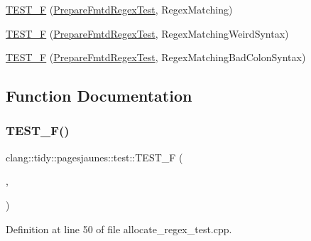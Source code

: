 \begin{DoxyCompactItemize}
\hyperlink{namespaceclang_1_1tidy_1_1pagesjaunes_1_1test_adefa0c55e6339f7e62c34be0a20923fa}{T\+E\+S\+T\+\_\+F} (\hyperlink{classclang_1_1tidy_1_1pagesjaunes_1_1test_1_1_prepare_fmtd_regex_test}{Prepare\+Fmtd\+Regex\+Test}, Regex\+Matching)
\item 
\hyperlink{namespaceclang_1_1tidy_1_1pagesjaunes_1_1test_a04a3722c20f4f679ebd39cac4a0af451}{T\+E\+S\+T\+\_\+F} (\hyperlink{classclang_1_1tidy_1_1pagesjaunes_1_1test_1_1_prepare_fmtd_regex_test}{Prepare\+Fmtd\+Regex\+Test}, Regex\+Matching\+Weird\+Syntax)
\item 
\hyperlink{namespaceclang_1_1tidy_1_1pagesjaunes_1_1test_a3fb5315c6f6fff42c5c1b4023c647b1d}{T\+E\+S\+T\+\_\+F} (\hyperlink{classclang_1_1tidy_1_1pagesjaunes_1_1test_1_1_prepare_fmtd_regex_test}{Prepare\+Fmtd\+Regex\+Test}, Regex\+Matching\+Bad\+Colon\+Syntax)
\end{DoxyCompactItemize}


\subsection{Function Documentation}
\mbox{\label{namespaceclang_1_1tidy_1_1pagesjaunes_1_1test_af7271fc9b6addd32cbf165dc1d586bcc}} 
\subsubsection{\texorpdfstring{T\+E\+S\+T\+\_\+\+F()}{TEST\_F()}\hspace{0.1cm}{\footnotesize\ttfamily [1/57]}}
{\footnotesize\ttfamily clang\+::tidy\+::pagesjaunes\+::test\+::\+T\+E\+S\+T\+\_\+F (\begin{DoxyParamCaption}\item[{\hyperlink{classclang_1_1tidy_1_1pagesjaunes_1_1test_1_1_allocate_regex_test}{Allocate\+Regex\+Test}}]{,  }\item[{Regex\+Matching\+Indicators}]{ }\end{DoxyParamCaption})}



Definition at line 50 of file allocate\+\_\+regex\+\_\+test.\+cpp.

